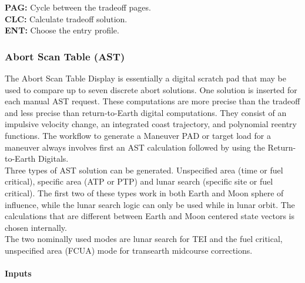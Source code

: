 \documentclass[11pt]{article} %
\begin{document}
\textbf{PAG:} Cycle between the tradeoff pages.\\
\textbf{CLC:} Calculate tradeoff solution.\\
\textbf{ENT:} Choose the entry profile.\\

\subsubsection{Abort Scan Table (AST)}

The Abort Scan Table Display is essentially a digital scratch pad that may be used to compare up to seven discrete abort solutions. One solution is inserted for
each manual AST request. These computations are more precise than the tradeoff and less precise than return-to-Earth digital computations. They consist of
an impulsive velocity change, an integrated coast trajectory, and polynomial reentry functions. The workflow to generate a Maneuver PAD or target load for a maneuver always involves first an AST calculation followed by using the Return-to-Earth Digitals.\\

Three types of AST solution can be generated. Unspecified area (time or fuel critical), specific area (ATP or PTP) and lunar search (specific site or fuel critical). The first two of these types work in both Earth and Moon sphere of influence, while the lunar search logic can only be used while in lunar orbit. The calculations that are different between Earth and Moon centered state vectors is chosen internally.\\

The two nominally used modes are lunar search for TEI and the fuel critical, unspecified area (FCUA) mode for transearth midcourse corrections.\\

\paragraph{Inputs}\mbox{} \\
\end{document}
